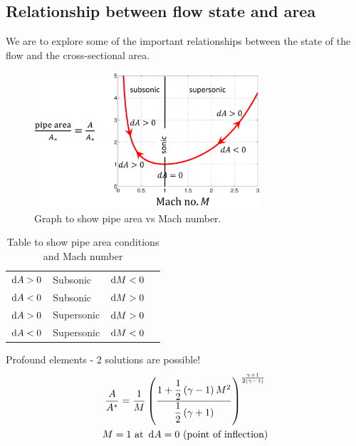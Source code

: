 \documentclass[class=report, crop=false, 12pt,a4paper]{standalone}
\begin{document}
\subsection{Relationship between flow state and area}
We are to explore some of the important relationships between the state of the flow and the cross-sectional area.
\begin{figure}[H]
    \centering
    \includegraphics[width = 0.75\textwidth]{../img/diagram52.png}
    \caption{Graph to show pipe area vs Mach number.}
\end{figure}
\begin{table}[H]
    \centering
    \begin{tabular}{@{}llll@{}}
        \toprule
        $\dif A > 0$ & Subsonic   & $\dif M < 0$ & \\
        $\dif A < 0$ & Subsonic   & $\dif M > 0$ & \\
        $\dif A > 0$ & Supersonic & $\dif M > 0$ & \\
        $\dif A < 0$ & Supersonic & $\dif M < 0$ & \\ \bottomrule
    \end{tabular}
    \caption{Table to show pipe area conditions and Mach number}
\end{table}
Profound elements - 2 solutions are possible!
\begin{gather}
    \frac{A}{A^*} = \frac{1}{M}\left(\frac{1+\dfrac{1}{2}\left(\gamma - 1\right)M^2}{\dfrac{1}{2}\left(\gamma + 1\right)}\right)^{\frac{\gamma + 1}{2\left(\gamma - 1\right)}}\\
    M = 1 \textrm{ at } \dif A = 0 \textrm{ (point of inflection)}
\end{gather}
\end{document}
